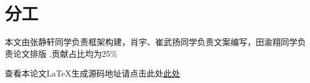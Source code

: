 \documentclass{article}
\begin{document}
\printbibliography
\section{分工}
本文由张静轩同学负责框架构建，肖宇、崔武扬同学负责文案编写，田渝翔同学负责论文排版
,贡献占比均为25\%

查看本论文LaTeX生成源码地址请点击此处\href{https://github.com/Fully-ripe-mango/Mycode/blob/main/Che_paper.tex}{此处}
\end{document}
